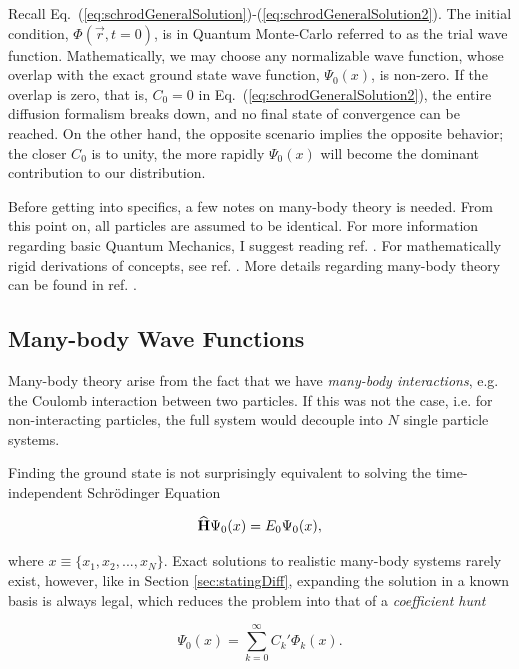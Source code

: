 Recall Eq.~(\ref{eq:schrodGeneralSolution})-(\ref{eq:schrodGeneralSolution2}). The initial condition, $\Phi(\vec r, t=0)$,
is in Quantum Monte-Carlo referred to as the trial wave function. Mathematically, we may choose any normalizable wave function, whose overlap with the exact ground state wave function, $\Psi_0(x)$, is non-zero. If the overlap is zero, that is, $C_0=0$ in Eq.~(\ref{eq:schrodGeneralSolution2}), the entire diffusion formalism breaks down, and no final state of convergence can be reached. On the other hand, the opposite scenario implies the opposite behavior; the closer $C_0$ is to unity, the more rapidly $\Psi_0(x)$ will become the dominant contribution to our distribution. 

Before getting into specifics, a few notes on many-body theory is needed. From this point on, all particles are assumed to be identical. For more information regarding basic Quantum Mechanics, I suggest reading ref. \cite{griffiths}. For mathematically rigid derivations of concepts, see ref. \cite{Sakurai:94}. More details regarding many-body theory can be found in ref. \cite{Shavitt}. 

\subsection{Many-body Wave Functions}
\label{sec:manyBodyWFs}

Many-body theory arise from the fact that we have \textit{many-body interactions}, e.g. the Coulomb interaction between two particles. If this was not the case, i.e. for non-interacting particles, the full system would decouple into $N$ single particle systems.

Finding the ground state is not surprisingly equivalent to solving the time-independent Schrödinger Equation

\begin{equation}
 {\bf\widehat{H}}\Psi_0(x) = E_0\Psi_0(x),
 \end{equation}
 
where $x \equiv \{x_1, x_2, ..., x_N\}$. Exact solutions to realistic many-body systems rarely exist, however, like in Section \ref{sec:statingDiff}, expanding the solution in a known basis is always legal, which reduces the problem into that of a \textit{coefficient hunt} 

\begin{equation}
\label{eq:manyBodyExp}
 \Psi_0(x) = \sum_{k=0}^\infty C_k'\Phi_k(x).
\end{equation}

